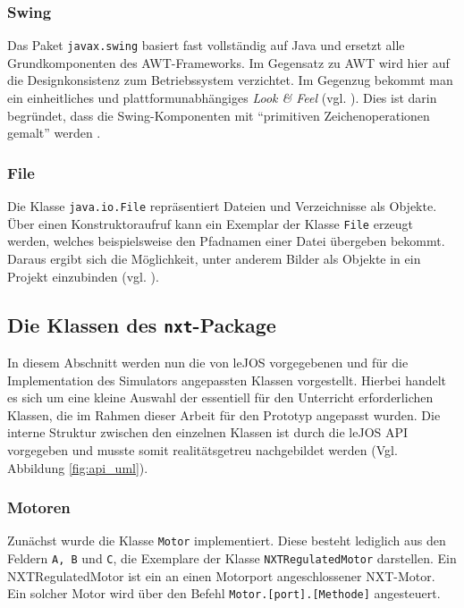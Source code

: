\documentclass[paper=a4, DIV=14, BCOR=15mm, twoside=on, onecolumn=on, open = right, titlepage =on, parskip =half, headsepline = on, footsepline = on, chapterprefix = on, appendixprefix = off, fontsize = 12pt, numbers = noenddot, abstract = on]{scrbook}
\begin{document}
\subsubsection*{Swing}

Das Paket \texttt{javax.swing} basiert fast vollständig auf Java und ersetzt alle Grundkomponenten des AWT-Frameworks. Im Gegensatz zu AWT wird hier auf die Designkonsistenz zum Betriebssystem verzichtet. Im Gegenzug bekommt man ein einheitliches und plattformunabhängiges \emph{Look \& Feel} (vgl. \cite[S.279]{abts:15}). Dies ist darin begründet, dass die Swing-Komponenten mit "`primitiven Zeichenoperationen gemalt"' werden \cite[S.1018]{ullenboom:12}.


\subsubsection*{File}

Die Klasse \texttt{java.io.File} repräsentiert Dateien und Verzeichnisse als Objekte. Über einen Konstruktoraufruf kann ein Exemplar der Klasse \texttt{File} erzeugt werden, welches beispielsweise den Pfadnamen einer Datei übergeben bekommt. Daraus ergibt sich die Möglichkeit, unter anderem Bilder als Objekte in ein Projekt einzubinden (vgl. \cite[S.205]{abts:15}).


\par \singlespacing
\subsection{Die Klassen des \texttt{nxt}-Package}
\label{sec:API}
\onehalfspacing
In diesem Abschnitt werden nun die von leJOS vorgegebenen und für die Implementation des Simulators angepassten Klassen vorgestellt. Hierbei handelt es sich um eine kleine Auswahl der essentiell für den Unterricht erforderlichen Klassen, die im Rahmen dieser Arbeit für den Prototyp angepasst wurden. Die interne Struktur zwischen den einzelnen Klassen ist durch die leJOS API vorgegeben und musste somit realitätsgetreu nachgebildet werden (Vgl. Abbildung \ref{fig:api_uml}).

\subsubsection{Motoren}
Zunächst wurde die Klasse \texttt{Motor} implementiert. Diese besteht lediglich aus den Feldern \texttt{A, B} und \texttt{C}, die Exemplare der Klasse \texttt{NXTRegulatedMotor} darstellen. Ein NXTRegulatedMotor ist ein an einen Motorport angeschlossener NXT-Motor. Ein solcher Motor wird über den Befehl \texttt{Motor.[port].[Methode]} angesteuert. 
\end{document}
